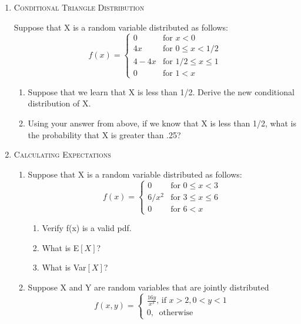 \documentclass[11pt,letterpaper]{article}
\numberwithin{equation}{section}
\begin{document}
\begin{enumerate}[I]
\item \textsc{Conditional Triangle Distribution} 

Suppose that X is a random variable distributed as follows:
$$f(x)=\begin{cases} 0 & \text{for } x< 0\\ 4x & \text{for } 0\leq x < 1/2 \\ 4-4x  & \text{for }  1/2 \leq x\leq 1\\ 0 &\text{for } 1<x
\end{cases}$$
\begin{enumerate}[1)]
\item Suppose that we learn that X is less than 1/2.  Derive the new conditional distribution of X.
\item Using your answer from above, if we know that X is less than 1/2, what is the probability that X is greater than .25? 
\end{enumerate}

\pagebreak
\item \textsc{Calculating Expectations}
\begin{enumerate}[1)]

\item Suppose that X is a random variable distributed as follows:
$$f(x)=\begin{cases} 0 & \text{for } 0\leq x < 3 \\ 6/x^2  & \text{for }  3\leq x\leq 6\\ 0 &\text{for } 6< x
\end{cases}$$
\begin{enumerate}[1)]
\item Verify f(x) is a valid pdf. %
\item What is E$[X]$? %
\item What is Var$[X]$?%

\end{enumerate}
\item Suppose X and Y are random variables that are jointly distributed 
$$f(x,y)=\begin{cases} \frac{16y}{x^3} \text{, if }x>2, 0<y<1\\ 0, \ \text{ otherwise }\end{cases}$$


\end{enumerate}
\end{enumerate}
\end{document}
